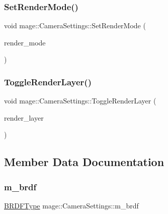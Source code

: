 \subsubsection{\texorpdfstring{Set\+Render\+Mode()}{SetRenderMode()}}
{\footnotesize\ttfamily void mage\+::\+Camera\+Settings\+::\+Set\+Render\+Mode (\begin{DoxyParamCaption}\item[{\hyperlink{namespacemage_a5e7e18b0154373ce8fc942fe3f6b27fd}{Render\+Mode}}]{render\+\_\+mode }\end{DoxyParamCaption})\hspace{0.3cm}{\ttfamily [noexcept]}}

\hypertarget{classmage_1_1_camera_settings_a47c34af7eddc2a0f6256d137b5813a4c}{}\label{classmage_1_1_camera_settings_a47c34af7eddc2a0f6256d137b5813a4c} 
\subsubsection{\texorpdfstring{Toggle\+Render\+Layer()}{ToggleRenderLayer()}}
{\footnotesize\ttfamily void mage\+::\+Camera\+Settings\+::\+Toggle\+Render\+Layer (\begin{DoxyParamCaption}\item[{\hyperlink{namespacemage_a8b4a82582105b0299e2c2be5af7255d6}{Render\+Layer}}]{render\+\_\+layer }\end{DoxyParamCaption})\hspace{0.3cm}{\ttfamily [noexcept]}}



\subsection{Member Data Documentation}
\hypertarget{classmage_1_1_camera_settings_ac6a51ea7c770af79de4f97b53cab83b7}{}\label{classmage_1_1_camera_settings_ac6a51ea7c770af79de4f97b53cab83b7} 
\subsubsection{\texorpdfstring{m\+\_\+brdf}{m\_brdf}}
{\footnotesize\ttfamily \hyperlink{namespacemage_ae7a7a03a7b34d7e2689689bb8295cd38}{B\+R\+D\+F\+Type} mage\+::\+Camera\+Settings\+::m\+\_\+brdf\hspace{0.3cm}{\ttfamily [private]}}


